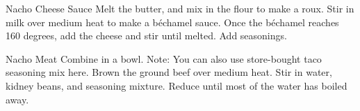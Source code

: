 \documentclass[]{article}
\title{}
\author{}
\begin{document}
\begin{recipe}{Nacho Cheese Sauce}{}{}
	Melt the butter, and mix in the flour to make a roux. 
	Stir in milk over medium heat to make a béchamel sauce. Once the béchamel reaches 160 degrees, add the cheese and stir until melted. 
	Add seasonings. 
\end{recipe}

\begin{recipe}{Nacho Meat}{}{}
	Combine in a bowl. Note: You can also use store-bought taco seasoning mix here. 
	Brown the ground beef over medium heat.
	Stir in water, kidney beans, and seasoning mixture. Reduce until most of the water has boiled away. 
\end{recipe}
\end{document}
